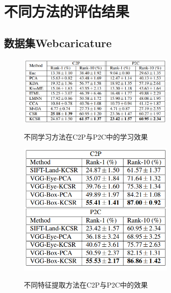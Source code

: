 \section{不同方法的评估结果}
\subsection{数据集Webcaricature}
\begin{figure}[H]
    \centering
    \includegraphics[width=3in]{sections/figs/eval1.png}
    \label{fig:my_label}
    \caption{\label{fig2.11} \xiaowuhao \hei 不同学习方法在C2P与P2C中的学习效果}
\end{figure}
\begin{figure}[H]
    \centering
    \includegraphics[width=3in]{sections/figs/eval2.png}
    \label{fig:my_label}
    \caption{\label{fig2.11} \xiaowuhao \hei 不同特征提取方法在C2P与P2C中的效果}
\end{figure}

